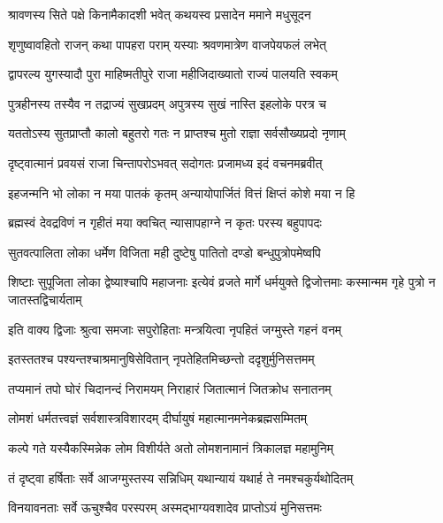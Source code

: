 \twolineshloka
{श्रावणस्य सिते पक्षे किनामैकादशी भवेत्}
{कथयस्व प्रसादेन ममाने मधुसूदन} %


\twolineshloka
{शृणुष्वावहितो राजन् कथा पापहरा पराम्}
{यस्याः श्रवणमात्रेण वाजपेयफलं लभेत्} %

\twolineshloka
{द्वापरल्य युगस्यादौ पुरा माहिष्मतीपुरे}
{राजा महीजिदाख्यातो राज्यं पालयति स्वकम्} %

\twolineshloka
{पुत्रहीनस्य तस्यैव न तद्राज्यं सुखप्रदम्}
{अपुत्रस्य सुखं नास्ति इहलोके परत्र च} %

\twolineshloka
{यततोऽस्य सुतप्राप्तौ कालो बहुतरो गतः}
{न प्राप्तश्च मुतो राज्ञा सर्वसौख्यप्रदो नृणाम्} %

\twolineshloka
{दृष्ट्वात्मानं प्रवयसं राजा चिन्तापरोऽभवत्}
{सदोगतः प्रजामध्य इदं वचनमब्रवीत्} %

\twolineshloka
{इहजन्मनि भो लोका न मया पातकं कृतम्}
{अन्यायोपार्जितं वित्तं क्षिप्तं कोशे मया न हि} %

\twolineshloka
{ब्रह्मस्वं देवद्रविणं न गृहीतं मया क्वचित्}
{न्यासापहाग्ने न कृतः परस्य बहुपापदः} %

\twolineshloka
{सुतवत्पालिता लोका धर्मेण विजिता मही}
{दुष्टेषु पातितो दण्डो बन्धुपुत्रोपमेष्वपि} %


\threelineshloka
{शिष्टाः सुपूजिता लोका द्वेष्याश्चापि महाजनाः}
{इत्येवं व्रजते मार्गे धर्मयुक्ते द्विजोत्तमाः}
{कस्मान्मम गृहे पुत्रो न जातस्तद्विचार्यताम्} %

\twolineshloka
{इति वाक्य द्विजाः श्रुत्वा समजाः सपुरोहिताः}
{मन्त्रयित्वा नृपहितं जग्मुस्ते गहनं वनम्} %

\twolineshloka
{इतस्ततश्च पश्यन्तश्चाश्रमानुषिसेवितान्}
{नृपतेहितमिच्छन्तो ददृशुर्मुनिसत्तमम्} %

\twolineshloka
{तप्यमानं तपो घोरं चिदानन्दं निरामयम्}
{निराहारं जितात्मानं जितक्रोध सनातनम्} %

\twolineshloka
{लोमशं धर्मतत्त्वज्ञं सर्वशास्त्रविशारदम्}
{दीर्घायुषं महात्मानमनेकब्रह्मसम्मितम्} %

\twolineshloka
{कल्पे गते यस्यैकस्मिन्नेक लोम विशीर्यते}
{अतो लोमशनामानं त्रिकालज्ञ महामुनिम्} %

\twolineshloka
{तं दृष्ट्वा हर्षिताः सर्वे आजग्मुस्तस्य सन्निधिम्}
{यथान्यायं यथार्ह ते नमश्चकुर्यथोदितम्} %

\twolineshloka
{विनयावनताः सर्वे ऊचुश्चैव परस्परम्}
{अस्मद्भाग्यवशादेव प्राप्तोऽयं मुनिसत्तमः} %


